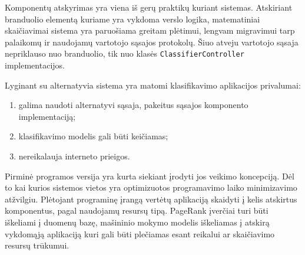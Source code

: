 Komponentų atskyrimas yra viena iš gerų praktikų kuriant sistemas. Atskiriant branduolio elementą kuriame yra
vykdoma verslo logika, matematiniai skaičiavimai sistema yra paruošiama greitam plėtimui, lengvam migravimui
tarp palaikomų ir naudojamų vartotojo sąsajos protokolų. Šiuo atveju vartotojo sąsaja nepriklauso nuo
branduolio, tik nuo klasės \texttt{ClassifierController} implementacijos.

Lyginant su alternatyvia sistema \cite{gapi} yra matomi klasifikavimo aplikacijos privalumai:
 \begin{enumerate}
    \item galima naudoti alternatyvi sąsaja, pakeitus sąsajos komponento implementaciją;
    \item klasifikavimo modelis gali būti keičiamas;
    \item nereikalauja interneto prieigos.
 \end{enumerate}

Pirminė programos versija yra kurta siekiant įrodyti jos veikimo koncepciją. Dėl to kai kurios sistemos vietos
yra optimizuotos programavimo laiko minimizavimo atžvilgiu. Plėtojant programinę įrangą vertėtų aplikaciją
skaidyti į kelis atskirtus komponentus, pagal naudojamų resursų tipą. PageRank įverčiai turi būti iškeliami
į duomenų bazę, mašininio mokymo modelis iškeliamas į atskirą vykdomąją aplikaciją kuri gali būti plečiamas
esant reikalui ar skaičiavimo resursų trūkumui.